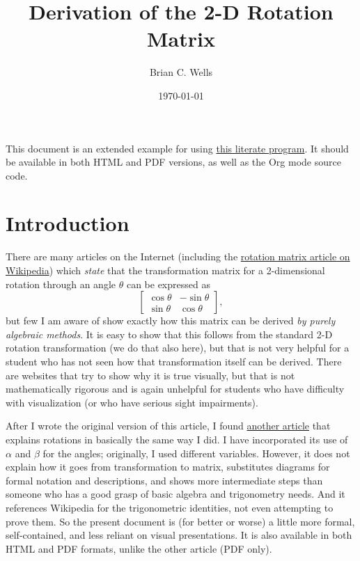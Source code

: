 \documentclass[11pt]{article}
\author{Brian C. Wells}
\date{\today}
\title{Derivation of the 2-D Rotation Matrix}
\begin{document}
\maketitle
\tableofcontents

This document is an extended example for using \href{../define.org}{this literate program}.
It should be available in both HTML and PDF versions, as well as the
Org mode source code.

\section*{Introduction}
\label{sec-1}

There are many articles on the Internet (including the \href{https://en.wikipedia.org/wiki/Rotation_matrix}{rotation matrix
article on Wikipedia}) which \emph{state} that the transformation matrix for
a 2-dimensional rotation through an angle $\theta$ can be expressed as
\begin{equation*}
\begin{bmatrix}
\cos\theta & -\sin\theta \\
\sin\theta & \cos\theta
\end{bmatrix},
\end{equation*}
but few I am aware of show exactly how this matrix can be derived \emph{by
purely algebraic methods}.  It is easy to show that this follows from
the standard 2-D rotation transformation (we do that also here), but
that is not very helpful for a student who has not seen how that
transformation itself can be derived.  There are websites that try to
show why it is true visually, but that is not mathematically rigorous
and is again unhelpful for students who have difficulty with
visualization (or who have serious sight impairments).

After I wrote the original version of this article, I found \href{http://www.sunshine2k.de/articles/RotationDerivation.pdf}{another
article} that explains rotations in basically the same way I did.  I
have incorporated its use of $\alpha$ and $\beta$ for the angles;
originally, I used different variables.  However, it does not explain
how it goes from transformation to matrix, substitutes diagrams for
formal notation and descriptions, and shows more intermediate steps
than someone who has a good grasp of basic algebra and trigonometry
needs.  And it references Wikipedia for the trigonometric identities,
not even attempting to prove them.  So the present document is (for
better or worse) a little more formal, self-contained, and less
reliant on visual presentations.  It is also available in both HTML
and PDF formats, unlike the other article (PDF only).
\end{document}
